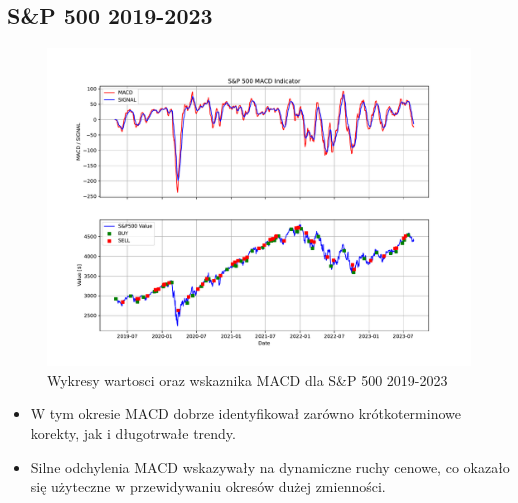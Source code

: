 \documentclass[12pt, letterpaper]{article}
\begin{document}
\subsection{S\&P 500 2019-2023}
\begin{figure}[h!]
    \centering
    \includegraphics[width=\linewidth]{MACD S&P500 from 3.pdf}
    \caption{Wykresy wartosci oraz wskaznika MACD dla S\&P 500 2019-2023} 
    \label{fig:sp500_2019_2023}
\end{figure}

\begin{itemize}
\item W tym okresie MACD dobrze identyfikował zarówno krótkoterminowe korekty, jak i długotrwałe trendy.
\item Silne odchylenia MACD wskazywały na dynamiczne ruchy cenowe, co okazało się użyteczne w przewidywaniu okresów dużej zmienności.
\end{itemize}

\vspace{5cm}  %
\end{document}
